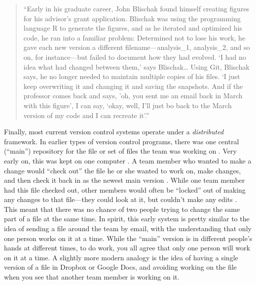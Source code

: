 \documentclass[]{tufte-book}
\begin{document}
\begin{quote}
``Early in his graduate career, John Blischak found himself creating figures
for his advisor's grant application. Blischak was using the programming language
R to generate the figures, and as he iterated and optimized his code, he ran
into a familiar problem: Determined not to lose his work, he gave each new
version a different filename---analysis\_1, analysis\_2, and so on, for
instance---but failed to document how they had evolved. `I had no idea what had
changed between them,' says Blischak\ldots{} Using Git, Blischak says, he no longer
needed to maintain multiple copies of his files. `I just keep overwriting it and
changing it and saving the snapshots. And if the professor comes back and says,
'oh, you sent me an email back in March with this figure', I can say, `okay,
well, I'll just bo back to the March version of my code and I can recreate
it'.'' \citep{perkel2018git}
\end{quote}

Finally, most current version control systems operate under a \emph{distributed}
framework. In earlier types of version control programs, there was one central
(``main'') repository for the file or set of files the team was working on
\citep{raymondunderstanding, target2018version}. Very early on, this was kept on one
computer \citep{irving2011astonishments}. A team member who wanted to make a change
would ``check out'' the file he or she wanted to work on, make changes, and then
check it back in as the newest main version \citep{raymond2003art}. While one team
member had this file checked out, other members would often be ``locked'' out of
making any changes to that file---they could look at it, but couldn't make any
edits \citep{raymondunderstanding, target2018version}. This meant that there was no
chance of two people trying to change the same part of a file at the same time.
In spirit, this early system is pretty similar to the idea of sending a file
around the team by email, with the understanding that only one person works on
it at a time. While the ``main'' version is in different people's hands at
different times, to do work, you all agree that only one person will work on it
at a time. A slightly more modern analogy is the idea of having a single version
of a file in Dropbox or Google Docs, and avoiding working on the file when you
see that another team member is working on it.
\end{document}
